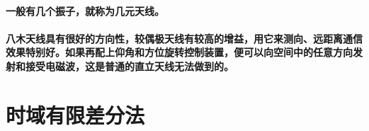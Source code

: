 \documentclass[UTF8]{ctexart}
\begin{document}
\paragraph{一般有几个振子，就称为几元天线。}
\paragraph{八木天线具有很好的方向性，较偶极天线有较高的增益，用它来测向、远距离通信效果特别好。如果再配上仰角和方位旋转控制装置，便可以向空间中的任意方向发射和接受电磁波，这是普通的直立天线无法做到的。}
\section{时域有限差分法}
\end{document}
